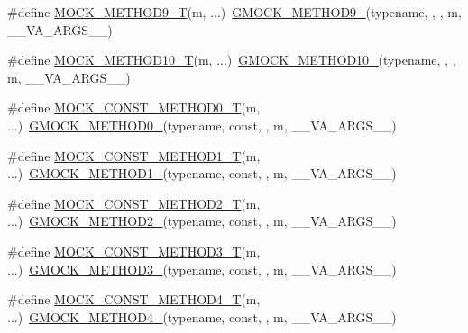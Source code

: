 \begin{DoxyCompactItemize}
\item 
\#define \hyperlink{gmock-generated-function-mockers_8h_a838c68cbdf422cfc703b83daf1d1f1e1}{M\+O\+C\+K\+\_\+\+M\+E\+T\+H\+O\+D9\+\_\+T}(m, ...)~\hyperlink{gmock-generated-function-mockers_8h_aa820171a19cc587c247dbe05cbffc55f}{G\+M\+O\+C\+K\+\_\+\+M\+E\+T\+H\+O\+D9\+\_\+}(typename, , , m, \+\_\+\+\_\+\+V\+A\+\_\+\+A\+R\+G\+S\+\_\+\+\_\+)
\item 
\#define \hyperlink{gmock-generated-function-mockers_8h_aa28723ba52933b5ea9a4ffa1a73d15e1}{M\+O\+C\+K\+\_\+\+M\+E\+T\+H\+O\+D10\+\_\+T}(m, ...)~\hyperlink{gmock-generated-function-mockers_8h_a81a48223a8771de36ef92ac6d56f6e81}{G\+M\+O\+C\+K\+\_\+\+M\+E\+T\+H\+O\+D10\+\_\+}(typename, , , m, \+\_\+\+\_\+\+V\+A\+\_\+\+A\+R\+G\+S\+\_\+\+\_\+)
\item 
\#define \hyperlink{gmock-generated-function-mockers_8h_a5fc82f3de9d5e83b0a6bb6cda98a8887}{M\+O\+C\+K\+\_\+\+C\+O\+N\+S\+T\+\_\+\+M\+E\+T\+H\+O\+D0\+\_\+T}(m, ...)~\hyperlink{gmock-generated-function-mockers_8h_ae0d290ffa58d7c624b2e3487ba1252f4}{G\+M\+O\+C\+K\+\_\+\+M\+E\+T\+H\+O\+D0\+\_\+}(typename, const, , m, \+\_\+\+\_\+\+V\+A\+\_\+\+A\+R\+G\+S\+\_\+\+\_\+)
\item 
\#define \hyperlink{gmock-generated-function-mockers_8h_a46dfe8631eee86b15a79aff8a2866621}{M\+O\+C\+K\+\_\+\+C\+O\+N\+S\+T\+\_\+\+M\+E\+T\+H\+O\+D1\+\_\+T}(m, ...)~\hyperlink{gmock-generated-function-mockers_8h_a1bc0012d62440dda77208dabdf4925c9}{G\+M\+O\+C\+K\+\_\+\+M\+E\+T\+H\+O\+D1\+\_\+}(typename, const, , m, \+\_\+\+\_\+\+V\+A\+\_\+\+A\+R\+G\+S\+\_\+\+\_\+)
\item 
\#define \hyperlink{gmock-generated-function-mockers_8h_a4337d7257aa4edff048aa406073b718b}{M\+O\+C\+K\+\_\+\+C\+O\+N\+S\+T\+\_\+\+M\+E\+T\+H\+O\+D2\+\_\+T}(m, ...)~\hyperlink{gmock-generated-function-mockers_8h_a885295ca6bebb15efb3fc786218c5d47}{G\+M\+O\+C\+K\+\_\+\+M\+E\+T\+H\+O\+D2\+\_\+}(typename, const, , m, \+\_\+\+\_\+\+V\+A\+\_\+\+A\+R\+G\+S\+\_\+\+\_\+)
\item 
\#define \hyperlink{gmock-generated-function-mockers_8h_a4c4c3417c197729f647fb0c700a41405}{M\+O\+C\+K\+\_\+\+C\+O\+N\+S\+T\+\_\+\+M\+E\+T\+H\+O\+D3\+\_\+T}(m, ...)~\hyperlink{gmock-generated-function-mockers_8h_af7c77ba511c631de02bb8c45a6ed3045}{G\+M\+O\+C\+K\+\_\+\+M\+E\+T\+H\+O\+D3\+\_\+}(typename, const, , m, \+\_\+\+\_\+\+V\+A\+\_\+\+A\+R\+G\+S\+\_\+\+\_\+)
\item 
\#define \hyperlink{gmock-generated-function-mockers_8h_a52290b1b841869d2d624b60ba1b6c3c4}{M\+O\+C\+K\+\_\+\+C\+O\+N\+S\+T\+\_\+\+M\+E\+T\+H\+O\+D4\+\_\+T}(m, ...)~\hyperlink{gmock-generated-function-mockers_8h_ab6430f2cfad9de4aca5258ea559294bb}{G\+M\+O\+C\+K\+\_\+\+M\+E\+T\+H\+O\+D4\+\_\+}(typename, const, , m, \+\_\+\+\_\+\+V\+A\+\_\+\+A\+R\+G\+S\+\_\+\+\_\+)

\end{DoxyCompactItemize}
